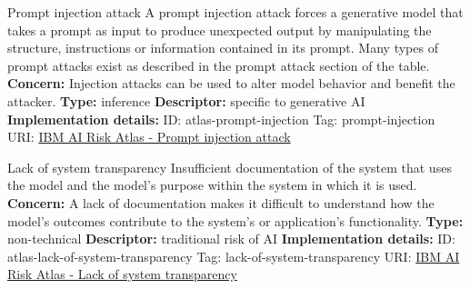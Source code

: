 \begin{definitionbox}{Prompt injection attack}
A prompt injection attack forces a generative model that takes a prompt as input to produce unexpected output by manipulating the structure, instructions or information contained in its prompt. Many types of prompt attacks exist as described in the prompt attack section of the table.\newline\newline
\textbf{Concern: }Injection attacks can be used to alter model behavior and benefit the attacker.\newline\newline
\textbf{Type: }inference\newline
\textbf{Descriptor: }specific to generative AI \newline\newline
\textbf{Implementation details: } \newline
ID: atlas-prompt-injection \newline
Tag: prompt-injection \newline
URI:  \href{https://www.ibm.com/docs/en/watsonx/saas?topic=SSYOK8/wsj/ai-risk-atlas/prompt-injection.html}{IBM AI Risk Atlas - Prompt injection attack}\newline
\end{definitionbox}
\begin{definitionbox}{Lack of system transparency}
Insufficient documentation of the system that uses the model and the model's purpose within the system in which it is used.\newline\newline
\textbf{Concern: }A lack of documentation makes it difficult to understand how the model's outcomes contribute to the system's or application's functionality.\newline\newline
\textbf{Type: }non-technical\newline
\textbf{Descriptor: }traditional risk of AI \newline\newline
\textbf{Implementation details: } \newline
ID: atlas-lack-of-system-transparency \newline
Tag: lack-of-system-transparency \newline
URI:  \href{https://www.ibm.com/docs/en/watsonx/saas?topic=SSYOK8/wsj/ai-risk-atlas/lack-of-system-transparency.html}{IBM AI Risk Atlas - Lack of system transparency}\newline
\end{definitionbox}
